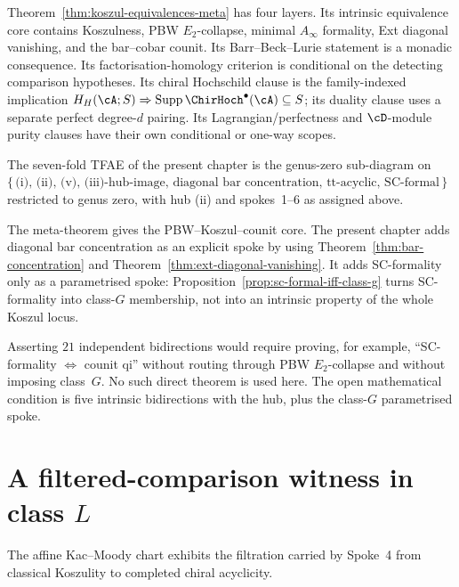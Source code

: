 Theorem~\ref{thm:koszul-equivalences-meta} has four layers.  Its
intrinsic equivalence core contains Koszulness, PBW $E_2$-collapse,
minimal $A_\infty$ formality, Ext diagonal vanishing, and the
bar--cobar counit.  Its Barr--Beck--Lurie statement is a monadic
consequence.  Its factorisation-homology criterion is conditional on
the detecting comparison hypotheses.  Its chiral Hochschild clause is
the family-indexed implication
$H_H(\cA;S)\Rightarrow
\operatorname{Supp}\ChirHoch^\bullet(\cA)\subseteq S$; its duality
clause uses a separate perfect degree-$d$ pairing.  Its
Lagrangian/perfectness and $\cD$-module purity clauses have their own
conditional or one-way scopes.

The seven-fold TFAE of the present chapter is the genus-zero
sub-diagram on
$\{\,\text{(i)},\,\text{(ii)},\,\text{(v)},\,\text{(iii)-hub-image},\,
\text{diagonal bar concentration},\,\text{tt-acyclic},\,
\text{SC-formal}\,\}$
restricted to genus zero, with hub (ii) and spokes~1--6 as assigned
above.

\begin{remark}
\label{rem:ftm-sevenfold-delta}
The meta-theorem gives the PBW--Koszul--counit core.  The present
chapter adds diagonal bar concentration as an explicit spoke by using
Theorem~\ref{thm:bar-concentration} and
Theorem~\ref{thm:ext-diagonal-vanishing}.  It adds SC-formality only
as a parametrised spoke: Proposition~\ref{prop:sc-formal-iff-class-g}
turns SC-formality into class-$G$ membership, not into an intrinsic
property of the whole Koszul locus.
\end{remark}

\begin{remark}
\label{rem:no-21-independence}
Asserting $21$ independent bidirections would require proving, for
example, ``SC-formality $\Leftrightarrow$ counit qi'' without routing
through PBW $E_2$-collapse and without imposing class~$G$.  No such
direct theorem is used here.  The open mathematical condition is five intrinsic
bidirections with the hub, plus the class-$G$ parametrised spoke.
\end{remark}

\section{A filtered-comparison witness in class $L$}
\label{sec:ftm-counterexample}

The affine Kac--Moody chart exhibits the filtration carried by
Spoke~4 from classical Koszulity to completed chiral acyclicity.

